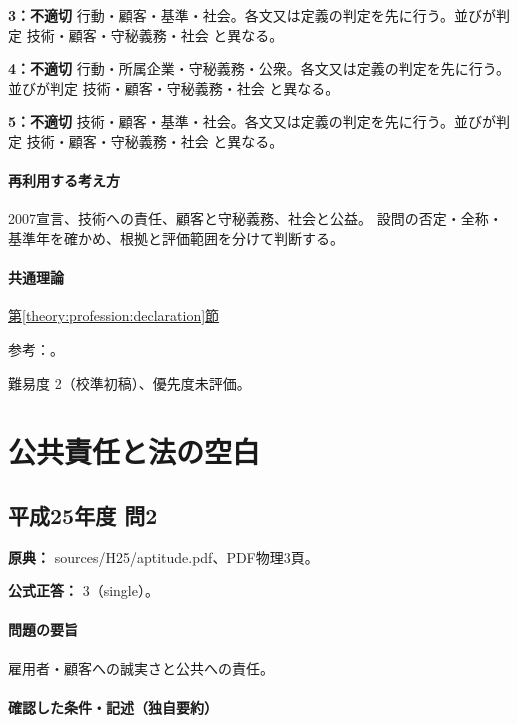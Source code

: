 \noindent\textbf{3：不適切} 行動・顧客・基準・社会。各文又は定義の判定を先に行う。並びが判定 技術・顧客・守秘義務・社会 と異なる。\par

\noindent\textbf{4：不適切} 行動・所属企業・守秘義務・公衆。各文又は定義の判定を先に行う。並びが判定 技術・顧客・守秘義務・社会 と異なる。\par

\noindent\textbf{5：不適切} 技術・顧客・基準・社会。各文又は定義の判定を先に行う。並びが判定 技術・顧客・守秘義務・社会 と異なる。\par

\paragraph{再利用する考え方} 2007宣言、技術への責任、顧客と守秘義務、社会と公益。 設問の否定・全称・基準年を確かめ、根拠と評価範囲を分けて判断する。

\paragraph{共通理論} \hyperref[theory:profession:declaration]{第\ref*{theory:profession:declaration}節}

\par 参考：\cite{eth54_profession2007}。

\par 難易度 2（校準初稿）、優先度未評価。

\section{公共責任と法の空白}

\subsection{平成25年度 問2}
\label{q:h25-reg-apt-02}

\noindent\textbf{原典：} sources/H25/aptitude.pdf、PDF物理3頁。

\textbf{公式正答：} 3（single）。

\paragraph{問題の要旨} 雇用者・顧客への誠実さと公共への責任。

\paragraph{確認した条件・記述（独自要約）}\mbox{}\par

